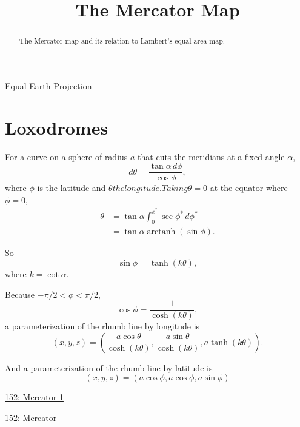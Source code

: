 \documentclass{ximera}
\title{The Mercator Map}
\begin{document}
\begin{abstract}
The Mercator map and its relation to Lambert's equal-area map.
\end{abstract}
\maketitle

\href{https://www.nytimes.com/2025/08/19/world/africa/africa-map-mercator.html}{Equal Earth Projection}


\section{Loxodromes}

For a curve on a sphere of radius $a$ that cuts the meridians at a fixed angle $\alpha$,
\[
  d\theta = \frac{\tan \alpha \, d\phi}{\cos\phi} ,
\]
where $\phi$ is the latitude and $\theta the longitude. Taking \theta = 0$ at the equator where $\phi=0$,
\begin{align*}
 \theta     &= \tan \alpha \int_0^{\phi^*} \sec \phi^* \, d\phi^*\\
               &= \tan \alpha \operatorname{arctanh}(\sin\phi) .
\end{align*}

So
\[
   \sin\phi = \operatorname{tanh}(k \theta),
\]
where $k=\cot\alpha$.

Because $-\pi/2 < \phi < \pi/2$,
\[
  \cos\phi =  \frac{1}{\cosh (k \theta)},
\]
a parameterization of the rhumb line by longitude is
\[
  (x,y,z) = \left( \frac{a\cos\theta}{\cosh(k\theta)} , \frac{a\sin\theta}{\cosh(k\theta)}  , a \tanh(k\theta)  \right) .
\]


And a parameterization of the rhumb line by latitude is
\[
   (x,y,z) = \left(  a    \cos\phi  ,   a    \cos\phi    ,   a \sin \phi   \right)
\]

\begin{onlineOnly}
    \begin{center}
\end{center}
\end{onlineOnly}

\href{https://www.desmos.com/3d/6cqnjsuew7}{152: Mercator 1}


\begin{onlineOnly}
    \begin{center}
\end{center}
\end{onlineOnly}

\begin{onlineOnly}
    \begin{center}
\end{center}
\end{onlineOnly}

\href{https://www.geogebra.org/classic/mvp9zvge}{152: Mercator}
\end{document}
